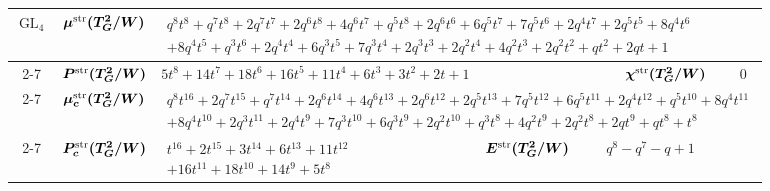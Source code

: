 \documentclass[11pt,english]{amsart}
\numberwithin{equation}{section}
\numberwithin{figure}{section}
\theoremstyle{plain}
\theoremstyle{plain}
\theoremstyle{definition}
\theoremstyle{remark}
\newcommand{\GL}{\operatorname{GL}}
\newcommand{\str}{\textup{str}}
\begin{document}
\begin{table}[H]
\begin{tabular}{|c||cccccl|}
\multirow{5}{*}{$\GL_4$} & $\bm{\mu^{\str}(T_{G}^2/W)}$    & \multicolumn{5}{|l|}{\tiny $\begin{array}{l}q^{8} t^{8} + q^{7} t^{8} + 2  q^{7} t^{7} + 2  q^{6} t^{8} + 4  q^{6} t^{7} + q^{5} t^{8} + 2  q^{6} t^{6} + 6  q^{5} t^{7} + 7  q^{5} t^{6} + 2  q^{4} t^{7} + 2  q^{5} t^{5} + 8  q^{4} t^{6} \\+ 8  q^{4} t^{5} + q^{3} t^{6} + 2  q^{4} t^{4} + 6  q^{3} t^{5} + 7  q^{3} t^{4} + 2  q^{3} t^{3} + 2  q^{2} t^{4} + 4  q^{2} t^{3} + 2  q^{2} t^{2} + q t^{2} + 2  q t + 1\end{array}$}  \\ \cline{2-7} 
                         & $\bm{P^{\str}(T_{G}^2/W)}$      & \multicolumn{3}{|l|}{$5  t^{8} + 14  t^{7} + 18  t^{6} + 16  t^{5} + 11  t^{4} + 6  t^{3} + 3  t^{2} + 2  t + 1$} & $\bm{\chi^{\str}(T_{G}^2/W)}$  & \multicolumn{1}{|l|}{$0$} \\ \cline{2-7} 
                         & $\bm{\mu^{\str}_c(T_{G}^2/W)}$  & \multicolumn{5}{|l|}{\tiny $\begin{array}{l}q^{8} t^{16} + 2  q^{7} t^{15} + q^{7} t^{14} + 2  q^{6} t^{14} + 4  q^{6} t^{13} + 2  q^{6} t^{12} + 2  q^{5} t^{13} + 7  q^{5} t^{12} + 6  q^{5} t^{11} + 2  q^{4} t^{12} + q^{5} t^{10} + 8  q^{4} t^{11} \\+ 8  q^{4} t^{10} + 2  q^{3} t^{11} + 2  q^{4} t^{9} + 7  q^{3} t^{10} + 6  q^{3} t^{9} + 2  q^{2} t^{10} + q^{3} t^{8} + 4  q^{2} t^{9} + 2  q^{2} t^{8} + 2  q t^{9} + q t^{8} + t^{8}\end{array}$} \\ \cline{2-7} 
                         & $\bm{P^{\str}_c(T_{G}^2/W)}$    & \multicolumn{2}{|l|}{\tiny $\begin{array}{l}t^{16} + 2  t^{15} + 3  t^{14} + 6  t^{13} + 11  t^{12} \\ + 16  t^{11} + 18  t^{10} + 14  t^{9} + 5  t^{8}\end{array}$} & $\bm{E^{\str}(T_{G}^2/W)}$ & \multicolumn{2}{|l|}{$q^{8} - q^{7} - q + 1$} \\ \hline\hline    


\end{tabular}
\end{table}
\end{document}
